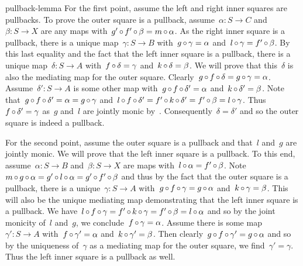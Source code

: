 \begin{solution}{pullback-lemma}%
    For the first point,
   assume the left and right inner squares are pullbacks.
To prove the outer square is a pullback,
    assume~$\alpha \colon S \to C$ and~$\beta\colon S \to X$
    are any maps with~$g' \mathop{\circ} f' \mathop{\circ} \beta = m \mathop{\circ} \alpha$.
As the right inner square is a pullback,
    there is a unique map~$\gamma\colon S \to B$
        with~$g \mathop{\circ} \gamma = \alpha$
            and~$l \mathop{\circ} \gamma = f' \mathop{\circ} \beta$.
By this last equality and the fact that the left inner square is
    a pullback, there is a unique map~$\delta \colon S \to A$
    with~$f \mathop{\circ} \delta = \gamma$
        and~$k \mathop{\circ} \delta = \beta$.
    We will prove that this~$\delta$ is also the mediating map
        for the outer square.
Clearly~$g \mathop{\circ} f \mathop{\circ} \delta = g \mathop{\circ} \gamma = \alpha$.
Assume~$\delta'\colon S \to A$
    is some other map with~$g \mathop{\circ} f \mathop{\circ} \delta' = \alpha$
    and~$k \mathop{\circ} \delta' = \beta$.
Note that~$g \mathop{\circ} f \mathop{\circ} \delta' = \alpha = g \mathop{\circ} \gamma$
    and~$l \mathop{\circ} f \mathop{\circ} \delta' = f' \mathop{\circ} k \mathop{\circ} \delta'
        = f' \mathop{\circ} \beta = l \mathop{\circ} \gamma$.
Thus~$f \mathop{\circ} \delta' = \gamma$ as~$g$ and~$l$ are jointly monic by~.
Consequently~$\delta=\delta'$ and so the outer square is indeed a pullback.

For the second point, assume the outer square is a pullback
    and that~$l$ and~$g$ are jointly monic.
We will prove that the left inner square is a pullback.
To this end, assume~$\alpha\colon S \to B$ and~$\beta\colon S \to X$
    are maps with~$l \mathop{\circ} \alpha = f' \mathop{\circ} \beta$.
Note~$m \mathop{\circ} g \mathop{\circ} \alpha = g' \mathop{\circ} l \mathop{\circ} \alpha = g' \mathop{\circ} f' \mathop{\circ} \beta$
    and thus by the fact that the outer square is a pullback,
        there is a unique~$\gamma\colon S \to A$
        with~$g \mathop{\circ} f \mathop{\circ} \gamma = g \mathop{\circ} \alpha$
            and~$k \mathop{\circ} \gamma = \beta$.
    This will also be the unique mediating map
        demonstrating that the left inner square is a pullback.
We have~$l \mathop{\circ} f \mathop{\circ} \gamma = f' \mathop{\circ} k \mathop{\circ} \gamma
        = f' \mathop{\circ} \beta = l \mathop{\circ} \alpha$
            and so by the joint monicity of~$l$ and~$g$,
            we conclude~$f \mathop{\circ} \gamma = \alpha$.
    Assume there is some map~$\gamma' \colon S \to A$
        with~$f \mathop{\circ} \gamma' = \alpha$ and~$k \mathop{\circ} \gamma' = \beta$.
Then clearly~$g \mathop{\circ} f \mathop{\circ} \gamma' = g \mathop{\circ} \alpha$
    and so by the uniqueness of~$\gamma$
    as a mediating map for the outer square,
    we find~$\gamma' = \gamma$.
    Thus the left inner square is a pullback as well.
\end{solution}
